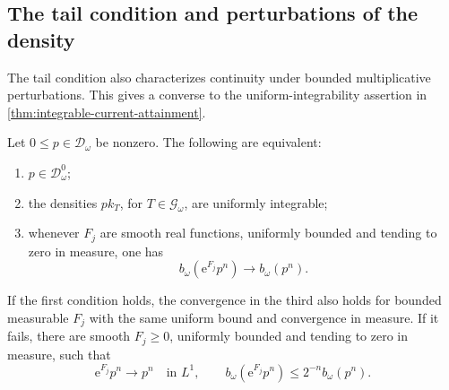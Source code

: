 \subsection{The tail condition and perturbations of the density}

The tail condition also characterizes continuity under bounded multiplicative perturbations. This gives a converse to the uniform-integrability assertion in \cref{thm:integrable-current-attainment}.

\begin{proposition}\label{prop:root-tail-continuity}
Let $0\leq p\in\mathcal D_\omega$ be nonzero. The following are equivalent:
\begin{enumerate}
\item $p\in\mathcal D_\omega^0$;
\item the densities $p k_T$, for $T\in\mathscr G_\omega$, are uniformly integrable;
\item whenever $F_j$ are smooth real functions, uniformly bounded and tending to zero in measure, one has
\[
 b_\omega(\mathrm{e}^{F_j}p^n)\longrightarrow b_\omega(p^n).
\]
\end{enumerate}
If the first condition holds, the convergence in the third also holds for bounded measurable $F_j$ with the same uniform bound and convergence in measure. If it fails, there are smooth $F_j\geq0$, uniformly bounded and tending to zero in measure, such that
\[
 \mathrm{e}^{F_j}p^n\longrightarrow p^n\quad\text{in }L^1,
 \qquad
 b_\omega(\mathrm{e}^{F_j}p^n)\leq2^{-n}b_\omega(p^n).
\]
\end{proposition}
